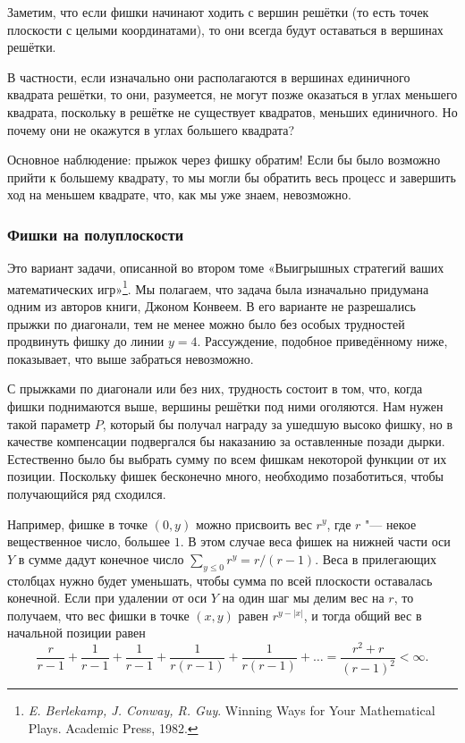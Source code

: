 \documentclass[twoside]{book}
\begin{document}
\medskip

Заметим, что если фишки начинают ходить с вершин решётки (то есть точек плоскости с целыми координатами), то они всегда будут оставаться в вершинах решётки.

В частности, если изначально они располагаются в вершинах единичного квадрата решётки, то они, разумеется, не могут позже оказаться в углах меньшего квадрата, поскольку в решётке не существует квадратов, меньших единичного.
Но почему они не окажутся в углах большего квадрата?

Основное наблюдение: прыжок через фишку обратим!
Если бы было возможно прийти к большему квадрату, то мы могли бы обратить весь процесс и завершить ход на меньшем квадрате, что, как мы уже знаем, невозможно.
\heart

\subsubsection*{Фишки на полуплоскости}%

Это вариант задачи, описанной во втором томе «Выигрышных стратегий ваших математических игр»\footnote{\label{winningways}\emph{E. Berlekamp, J. Conway, R. Guy}. {Winning Ways for Your Mathematical Plays.} Academic Press, 1982.}.
Мы полагаем, что задача была изначально придумана
одним из авторов книги, Джоном Конвеем.
В его варианте не разрешались
прыжки по диагонали, тем не менее можно было без особых трудностей
продвинуть фишку до линии $y = 4$.
Рассуждение, подобное приведённому
ниже, показывает, что выше забраться невозможно.

\medskip

С прыжками по диагонали или без них, трудность состоит в том, что,
когда фишки поднимаются выше, вершины решётки под ними оголяются.
Нам
нужен такой параметр $P$, который бы получал награду за ушедшую высоко
фишку, но в качестве компенсации подвергался бы наказанию за
оставленные позади дырки.
Естественно было бы выбрать сумму по всем
фишкам некоторой функции от их позиции.
Поскольку фишек бесконечно
много, необходимо позаботиться, чтобы получающийся ряд сходился.

Например, фишке в точке $(0, y)$ можно присвоить вес $r^y$, где $r$ "--- некое вещественное число, большее $1$.
В этом случае веса фишек на нижней части оси $Y$ в сумме дадут конечное число $\sum\limits_{y\le 0}r^y = r/(r-1)$.
Веса в прилегающих столбцах нужно будет уменьшать, чтобы сумма по всей плоскости оставалась конечной.
Если при удалении от оси $Y$ на один шаг  мы делим вес на $r$, то получаем, что вес фишки в точке $(x, y)$ равен $r^{y - |x|}$, и тогда общий вес в начальной позиции равен
\[\frac r{r-1} + \frac 1{r-1} +\frac 1{r-1} +\frac 1{r(r-1)} +\frac 1{r(r-1)} + \ldots =\frac{r^2+r}{(r-1)^2} <\infty.\]
\end{document}
